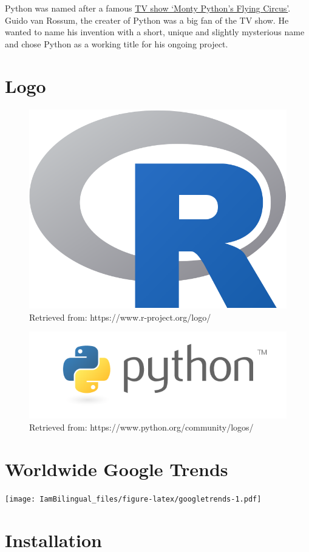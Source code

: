\documentclass[]{book}
\begin{document}
Python was named after a famous \href{https://en.wikipedia.org/wiki/Monty_Python\%27s_Flying_Circus}{TV show `Monty Python's Flying Circus'}. Guido van Rossum, the creater of Python was a big fan of the TV show. He wanted to name his invention with a short, unique and slightly mysterious name and chose Python as a working title for his ongoing project.

\hypertarget{logo}{%
\section{Logo}\label{logo}}

\begin{figure}

{\centering \includegraphics[width=0.3\linewidth]{fig/C1_Rlogo} 

}

\caption{Retrieved from: https://www.r-project.org/logo/}\label{fig:unnamed-chunk-1}
\end{figure}

\begin{figure}

{\centering \includegraphics[width=0.6\linewidth]{fig/C1_Pythonlogo} 

}

\caption{Retrieved from: https://www.python.org/community/logos/}\label{fig:unnamed-chunk-2}
\end{figure}

\hypertarget{worldwide-google-trends}{%
\section{Worldwide Google Trends}\label{worldwide-google-trends}}

\texttt{[image: IamBilingual\_files/figure-latex/googletrends-1.pdf]}

\hypertarget{installation}{%
\section{Installation}\label{installation}}
\end{document}
